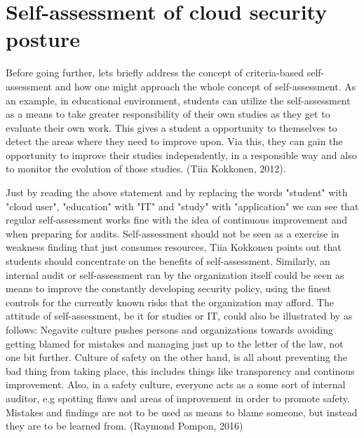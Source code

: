 \documentclass{article}
\begin{document}
\section{Self-assessment of cloud security posture}
Before going further, lets briefly address the concept of criteria-based self-assessment and how one might approach the whole concept of self-assessment. 
As an example, in educational environment, students can utilize the self-assessment as a means to take greater responsibility of their own studies as they get to evaluate their own work. This gives a student a opportunity to themselves to detect the areas where they need to improve upon.
Via this, they can gain the opportunity to improve their studies independently, in a responsible way and also to monitor the evolution of those studies. (Tiia Kokkonen, 2012).
\par
Just by reading the above statement and by replacing the words "student" with "cloud user", "education" with "IT" and "study" with "application" we can see that regular self-assessment works fine with the idea of continuous improvement and when preparing for audits.
Self-assessment should not be seen as a exercise in weakness finding that just consumes resources, Tiia Kokkonen points out that students should concentrate on the benefits of self-assessment.
Similarly, an internal audit or self-assessment ran by the organization itself could be seen as means to improve the constantly developing security policy, using the finest controls for the currently known risks that the organization may afford.
The attitude of self-assessment, be it for studies or IT, could also be illustrated by as follows: Negavite culture pushes persons and organizations towards avoiding getting blamed for mistakes and managing just up to the letter of the law, not one bit further.
Culture of safety on the other hand, is all about preventing the bad thing from taking place, this includes things like transparency and continous improvement. Also, in a safety culture, everyone acts as a some sort of internal auditor, e.g spotting flaws and areas of improvement in order to promote safety. Mistakes and findings are not to be used as means to blame someone, but instead they are to be learned from. (Raymond Pompon, 2016)
\end{document}
